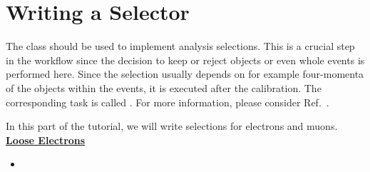 \section{Writing a Selector}\label{sec:selector}

The  class should be used to implement analysis selections.
This is a crucial step in the workflow since the decision to keep or reject objects or even whole events is performed here.
Since the selection usually depends on for example four-momenta of the objects within the events, it is executed after the calibration.
The corresponding task is called .
For more information, please consider Ref.~\cite{cf_repo}.

\begin{table}[t]
\end{table}
In this part of the tutorial, we will write selections for electrons and muons.
\textbf{\underline{Loose Electrons}}
\begin{itemize}
    \item
\end{itemize}
